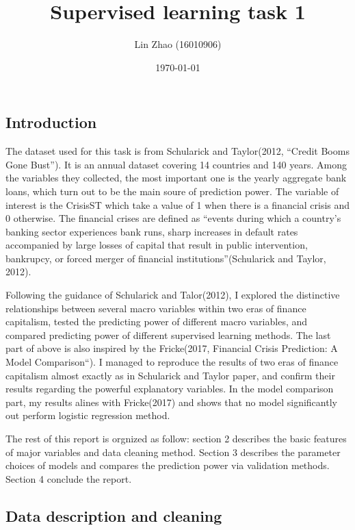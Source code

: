 \documentclass{article}
\begin{document}
\title{Supervised learning task 1}
\author{Lin Zhao (16010906)}
\date{\today}
\maketitle

\subsection*{Introduction}

The dataset used for this task is from Schularick and Taylor(2012,
``Credit Booms Gone Bust''). It is an annual dataset covering 14
countries and 140 years. Among the variables they collected, the most
important one is the yearly aggregate bank loans, which turn out to be
the main soure of prediction power. The variable of interest is the
CrisisST which take a value of 1 when there is a financial crisis and 0
otherwise. The financial crises are defined as ``events during which a
country's banking sector experiences bank runs, sharp increases in
default rates accompanied by large losses of capital that result in
public intervention, bankrupcy, or forced merger of financial
institutions''(Schularick and Taylor, 2012).

Following the guidance of Schularick and Talor(2012), I explored the
distinctive relationships between several macro variables within two
eras of finance capitalism, tested the predicting power of different
macro variables, and compared predicting power of different supervised
learning methods. The last part of above is also inspired by the
Fricke(2017, Financial Crisis Prediction: A Model Comparison``). I
managed to reproduce the results of two eras of finance capitalism
almost exactly as in Schularick and Taylor paper, and confirm their
results regarding the powerful explanatory variables. In the model
comparison part, my results alines with Fricke(2017) and shows that no
model significantly out perform logistic regression method.

The rest of this report is orgnized as follow: section 2 describes the
basic features of major variables and data cleaning method. Section 3
describes the parameter choices of models and compares the prediction
power via validation methods. Section 4 conclude the report.

\subsection*{Data description and cleaning}
\end{document}
